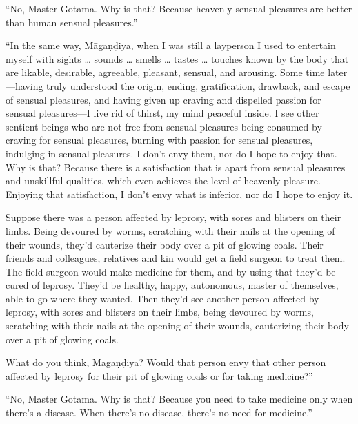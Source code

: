 \documentclass[12pt,openany]{book}%
\begin{document}
“No, Master Gotama. Why is that? Because heavenly sensual pleasures are better than human sensual pleasures.” 

“In the same way, \textsanskrit{Māgaṇḍiya}, when I was still a layperson I used to entertain myself with sights … sounds … smells … tastes … touches known by the body that are likable, desirable, agreeable, pleasant, sensual, and arousing. Some time later—having truly understood the origin, ending, gratification, drawback, and escape of sensual pleasures, and having given up craving and dispelled passion for sensual pleasures—I live rid of thirst, my mind peaceful inside. I see other sentient beings who are not free from sensual pleasures being consumed by craving for sensual pleasures, burning with passion for sensual pleasures, indulging in sensual pleasures. I don’t envy them, nor do I hope to enjoy that. Why is that? Because there is a satisfaction that is apart from sensual pleasures and unskillful qualities, which even achieves the level of heavenly pleasure. Enjoying that satisfaction, I don’t envy what is inferior, nor do I hope to enjoy it. 

Suppose there was a person affected by leprosy, with sores and blisters on their limbs. Being devoured by worms, scratching with their nails at the opening of their wounds, they’d cauterize their body over a pit of glowing coals. Their friends and colleagues, relatives and kin would get a field surgeon to treat them. The field surgeon would make medicine for them, and by using that they’d be cured of leprosy. They’d be healthy, happy, autonomous, master of themselves, able to go where they wanted. Then they’d see another person affected by leprosy, with sores and blisters on their limbs, being devoured by worms, scratching with their nails at the opening of their wounds, cauterizing their body over a pit of glowing coals. 

What do you think, \textsanskrit{Māgaṇḍiya}? Would that person envy that other person affected by leprosy for their pit of glowing coals or for taking medicine?” 

“No, Master Gotama. Why is that? Because you need to take medicine only when there’s a disease. When there’s no disease, there’s no need for medicine.” 
\end{document}
